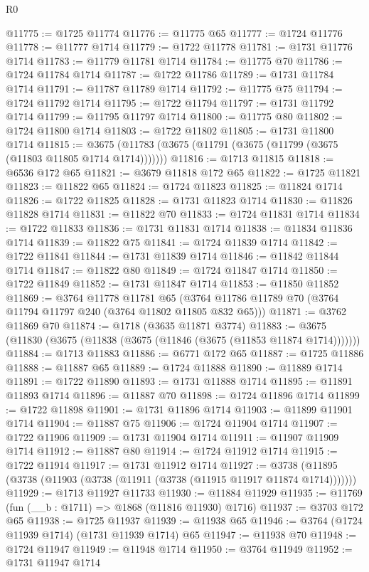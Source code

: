 \begin{lexlean}{R0}
\begin{coremodule}
@11775 := @1725 @11774
@11776 := @11775 @65
@11777 := @1724 @11776
@11778 := @11777 @1714
@11779 := @1722 @11778
@11781 := @1731 @11776 @1714
@11783 := @11779 @11781 @1714
@11784 := @11775 @70
@11786 := @1724 @11784 @1714
@11787 := @1722 @11786
@11789 := @1731 @11784 @1714
@11791 := @11787 @11789 @1714
@11792 := @11775 @75
@11794 := @1724 @11792 @1714
@11795 := @1722 @11794
@11797 := @1731 @11792 @1714
@11799 := @11795 @11797 @1714
@11800 := @11775 @80
@11802 := @1724 @11800 @1714
@11803 := @1722 @11802
@11805 := @1731 @11800 @1714
@11815 := @3675 (@11783 (@3675 (@11791 (@3675 (@11799 (@3675 (@11803 @11805 @1714 @1714)))))))
@11816 := @1713 @11815
@11818 := @6536 @172 @65
@11821 := @3679 @11818 @172 @65
@11822 := @1725 @11821
@11823 := @11822 @65
@11824 := @1724 @11823
@11825 := @11824 @1714
@11826 := @1722 @11825
@11828 := @1731 @11823 @1714
@11830 := @11826 @11828 @1714
@11831 := @11822 @70
@11833 := @1724 @11831 @1714
@11834 := @1722 @11833
@11836 := @1731 @11831 @1714
@11838 := @11834 @11836 @1714
@11839 := @11822 @75
@11841 := @1724 @11839 @1714
@11842 := @1722 @11841
@11844 := @1731 @11839 @1714
@11846 := @11842 @11844 @1714
@11847 := @11822 @80
@11849 := @1724 @11847 @1714
@11850 := @1722 @11849
@11852 := @1731 @11847 @1714
@11853 := @11850 @11852
@11869 := @3764
    @11778
    @11781
    @65
    (@3764 @11786 @11789 @70 (@3764 @11794 @11797 @240 (@3764 @11802 @11805 @832 @65)))
@11871 := @3762 @11869 @70
@11874 := @1718 (@3635 @11871 @3774)
@11883 := @3675 (@11830 (@3675 (@11838 (@3675 (@11846 (@3675 (@11853 @11874 @1714)))))))
@11884 := @1713 @11883
@11886 := @6771 @172 @65
@11887 := @1725 @11886
@11888 := @11887 @65
@11889 := @1724 @11888
@11890 := @11889 @1714
@11891 := @1722 @11890
@11893 := @1731 @11888 @1714
@11895 := @11891 @11893 @1714
@11896 := @11887 @70
@11898 := @1724 @11896 @1714
@11899 := @1722 @11898
@11901 := @1731 @11896 @1714
@11903 := @11899 @11901 @1714
@11904 := @11887 @75
@11906 := @1724 @11904 @1714
@11907 := @1722 @11906
@11909 := @1731 @11904 @1714
@11911 := @11907 @11909 @1714
@11912 := @11887 @80
@11914 := @1724 @11912 @1714
@11915 := @1722 @11914
@11917 := @1731 @11912 @1714
@11927 := @3738 (@11895 (@3738 (@11903 (@3738 (@11911 (@3738 (@11915 @11917 @11874 @1714)))))))
@11929 := @1713 @11927 @11733
@11930 := @11884 @11929
@11935 := @11769 (fun (__b : @1711) => @1868 (@11816 @11930) @1716)
@11937 := @3703 @172 @65
@11938 := @1725 @11937
@11939 := @11938 @65
@11946 := @3764 (@1724 @11939 @1714) (@1731 @11939 @1714) @65
@11947 := @11938 @70
@11948 := @1724 @11947
@11949 := @11948 @1714
@11950 := @3764 @11949
@11952 := @1731 @11947 @1714

\end{coremodule}
\end{lexlean}
